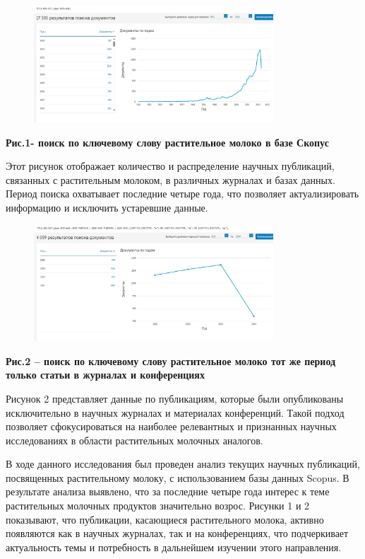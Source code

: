 \begin{figure}[H]
	\centering
	\includegraphics[width=0.8\textwidth]{media/pish/image47}
	\caption*{}
\end{figure}


{\bfseries Рис.1- поиск по ключевому слову растительное молоко в базе
Скопус}

Этот рисунок отображает количество и распределение научных публикаций,
связанных с растительным молоком, в различных журналах и базах данных.
Период поиска охватывает последние четыре года, что позволяет
актуализировать информацию и исключить устаревшие данные.


\begin{figure}[H]
	\centering
	\includegraphics[width=0.8\textwidth]{media/pish/image48}
	\caption*{}
\end{figure}


{\bfseries Рис.2 -- поиск по ключевому слову растительное молоко тот же
период только статьи в журналах и конференциях}

Рисунок 2 представляет данные по публикациям, которые были опубликованы
исключительно в научных журналах и материалах конференций. Такой подход
позволяет сфокусироваться на наиболее релевантных и признанных научных
исследованиях в области растительных молочных аналогов.

В ходе данного исследования был проведен анализ текущих научных
публикаций, посвященных растительному молоку, с использованием базы
данных Scopus. В результате анализа выявлено, что за последние четыре
года интерес к теме растительных молочных продуктов значительно возрос.
Рисунки 1 и 2 показывают, что публикации, касающиеся растительного
молока, активно появляются как в научных журналах, так и на
конференциях, что подчеркивает актуальность темы и потребность в
дальнейшем изучении этого направления.

